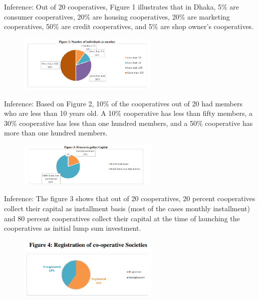   Inference: Out of 20 cooperatives, Figure 1 illustrates that in Dhaka, 5\% are consumer cooperatives, 20\% are housing cooperatives, 20\% are marketing cooperatives, 50\% are credit cooperatives, and 5\% are shop owner's cooperatives.
  
  \begin{figure}[h]
    \centering
    \includegraphics[width=0.6\textwidth]{Chap1/figure2.PNG}
    \label{fig:example}
  \end{figure}

  Inference: Based on Figure 2, 10\% of the cooperatives out of 20 had members who are less than 10 years old. A 10\% cooperative has less than fifty members, a 30\% cooperative has less than one hundred members, and a 50\% cooperative has more than one hundred members.

\begin{figure}[h]
    \centering
    \includegraphics[width=0.6\textwidth]{Chap1/figure3.PNG}
    \label{fig:example}
  \end{figure}

  Inference: The figure 3 shows that out of 20 cooperatives, 20 percent cooperatives collect their capital as 
installment basis (most of the cases monthly installment) and 80 percent cooperatives collect their capital at the 
time of launching the cooperatives as initial lump sum investment. 

\begin{figure}[h]
    \centering
    \includegraphics[width=0.6\textwidth]{Chap1/figure4.1.PNG}
    \label{fig:example}
    \centering
    \includegraphics[width=0.6\textwidth]{Chap1/figure4.PNG}
    \label{fig:example}
  \end{figure}

